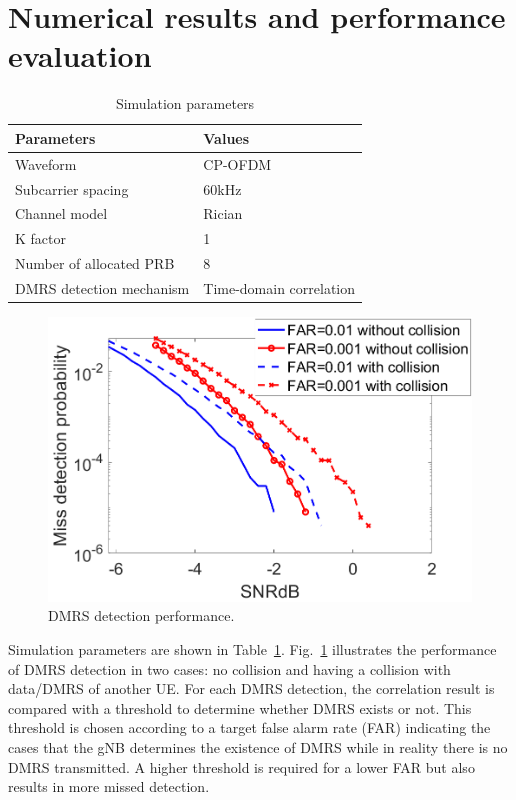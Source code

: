 \documentclass[conference]{IEEEtran}
\begin{document}
\section{Numerical results and performance evaluation}\label{III}

\begin{table}[htbp]
\caption{Simulation parameters}
\begin{center}
\begin{tabular}{|p{8em}|p{8em}|}
 \hline
 \textbf{Parameters} & \textbf{Values}\\
 \hline
 Waveform & CP-OFDM\\
 \hline
 Subcarrier spacing & 60kHz\\
 \hline
 Channel model & Rician\\
 \hline
 K factor & 1\\
 \hline
 Number of allocated PRB & 8\\
 \hline
 DMRS detection mechanism & Time-domain correlation\\
 

 
 \hline
\end{tabular}
\label{tab1}
\end{center}
\end{table}

\begin{figure}[htbp]
\centerline{\includegraphics[scale=0.4]{fig5.png}}
\caption{DMRS detection performance.}
\label{fig5}
\end{figure}

Simulation parameters are shown in Table~\ref{tab1}. Fig.~\ref{fig5} illustrates the performance of DMRS detection in two cases: no collision and having a collision with data/DMRS of another UE. For each DMRS detection, the correlation result is compared with a threshold to determine whether DMRS exists or not. This threshold is chosen according to a target false alarm rate (FAR) indicating the cases that the gNB determines the existence of DMRS while in reality there is no DMRS transmitted. A higher threshold is required for a lower FAR but also results in more missed detection.
\end{document}
